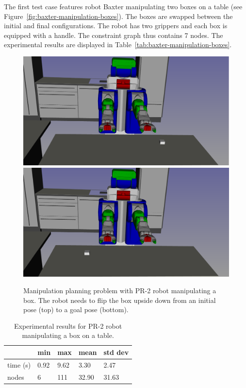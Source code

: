 The first test case features robot Baxter manipulating two boxes on a table (see Figure~\ref{fig:baxter-manipulation-boxes}). The boxes are swapped between the initial and final configurations. The robot has two grippers and each box is equipped with a handle. The constraint graph thus contains 7 nodes. The experimental results are displayed in Table~\ref{tab:baxter-manipulation-boxes}.

\begin{figure}
  \begin{center}
    \includegraphics[width=\linewidth]{figures/pr2-manipulation-two-hands-init.png}
    \includegraphics[width=\linewidth]{figures/pr2-manipulation-two-hands-goal.png}    
  \end{center}
  \caption{Manipulation planning problem with PR-2 robot manipulating a box. The robot needs to flip the box upside down from an initial pose (top) to a goal pose (bottom).}
  \label{fig:pr2-manipulation-two-hands}
\end{figure}

\begin{table}
  \begin{center}
  \begin{tabular}{|l|l|l|l|l|}
    \hline
    & min & max & mean & std dev \\
    \hline
    time (s) & 0.92 & 9.62 & 3.30 & 2.47 \\
    nodes & 6 &  111 & 32.90 & 31.63 \\
    \hline
  \end{tabular}
  \end{center}
  \caption{Experimental results for PR-2 robot manipulating a box on a table.}
  \label{tab:pr2-manipulation-two-hands}
\end{table}

